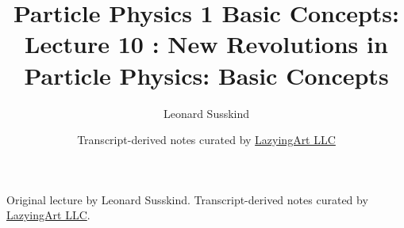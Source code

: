 \documentclass[11pt,oneside]{book}
\begin{document}
\frontmatter
\title{Particle Physics 1 Basic Concepts: Lecture 10 : New Revolutions in Particle Physics: Basic Concepts}
\author{Leonard Susskind}
\date{Transcript-derived notes curated by \href{https://lazying.art}{LazyingArt LLC}}
\maketitle
\begin{center}
\small Original lecture by Leonard Susskind. Transcript-derived notes curated by \href{https://lazying.art}{LazyingArt LLC}.
\end{center}
\clearpage
\mainmatter

\end{document}

